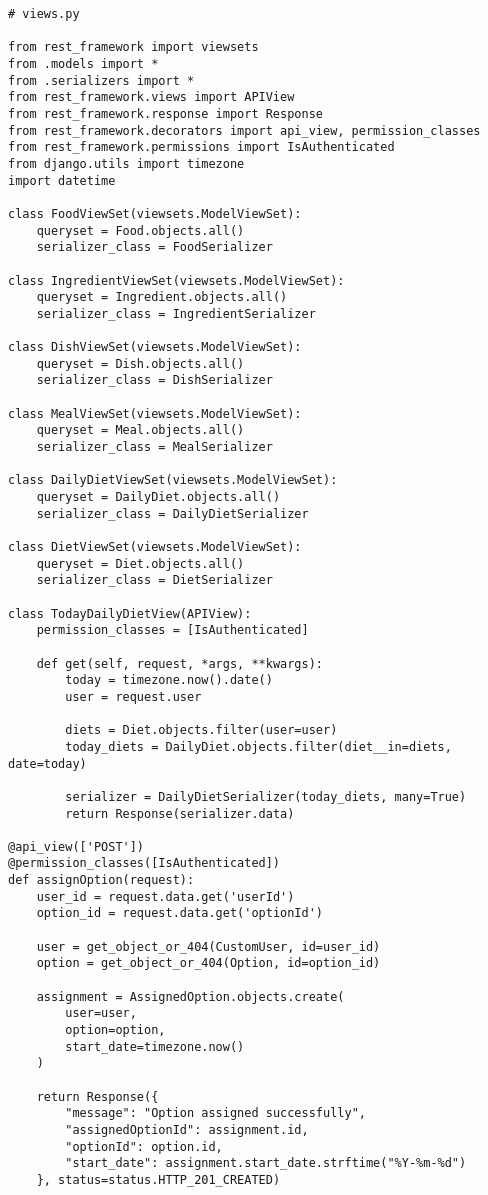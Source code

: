 \begin{verbatim}
# views.py

from rest_framework import viewsets
from .models import *
from .serializers import *
from rest_framework.views import APIView
from rest_framework.response import Response
from rest_framework.decorators import api_view, permission_classes
from rest_framework.permissions import IsAuthenticated
from django.utils import timezone
import datetime

class FoodViewSet(viewsets.ModelViewSet):
    queryset = Food.objects.all()
    serializer_class = FoodSerializer

class IngredientViewSet(viewsets.ModelViewSet):
    queryset = Ingredient.objects.all()
    serializer_class = IngredientSerializer

class DishViewSet(viewsets.ModelViewSet):
    queryset = Dish.objects.all()
    serializer_class = DishSerializer

class MealViewSet(viewsets.ModelViewSet):
    queryset = Meal.objects.all()
    serializer_class = MealSerializer

class DailyDietViewSet(viewsets.ModelViewSet):
    queryset = DailyDiet.objects.all()
    serializer_class = DailyDietSerializer

class DietViewSet(viewsets.ModelViewSet):
    queryset = Diet.objects.all()
    serializer_class = DietSerializer

class TodayDailyDietView(APIView):
    permission_classes = [IsAuthenticated]
    
    def get(self, request, *args, **kwargs):
        today = timezone.now().date()
        user = request.user
        
        diets = Diet.objects.filter(user=user)
        today_diets = DailyDiet.objects.filter(diet__in=diets, date=today)
        
        serializer = DailyDietSerializer(today_diets, many=True)
        return Response(serializer.data)

@api_view(['POST'])
@permission_classes([IsAuthenticated])
def assignOption(request):
    user_id = request.data.get('userId')
    option_id = request.data.get('optionId')

    user = get_object_or_404(CustomUser, id=user_id)
    option = get_object_or_404(Option, id=option_id)

    assignment = AssignedOption.objects.create(
        user=user,
        option=option,
        start_date=timezone.now()
    )

    return Response({
        "message": "Option assigned successfully",
        "assignedOptionId": assignment.id,
        "optionId": option.id,
        "start_date": assignment.start_date.strftime("%Y-%m-%d")
    }, status=status.HTTP_201_CREATED)
\end{verbatim}


